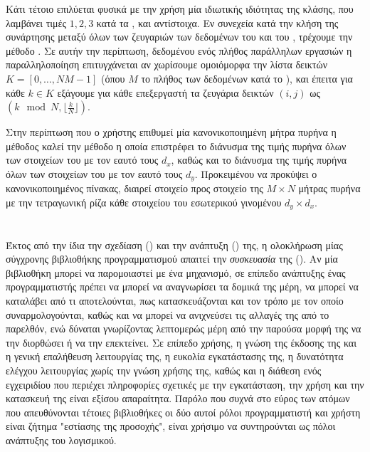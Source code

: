 Κάτι τέτοιο επιλύεται φυσικά με την χρήση μία ιδιωτικής ιδιότητας \texttt{} της κλάσης, που λαμβάνει τιμές $1, 2, 3$ κατά τα \texttt{}, \texttt{} και \texttt{} αντίστοιχα.
Εν συνεχεία κατά την κλήση της συνάρτησης \texttt{} μεταξύ όλων των ζευγαριών των δεδομένων του \texttt{} και του \texttt{}, τρέχουμε την μέθοδο \texttt{}.
Σε αυτήν την περίπτωση, δεδομένου ενός πλήθος παράλληλων εργασιών \texttt{} η παραλληλοποίηση επιτυγχάνεται αν χωρίσουμε ομοιόμορφα την λίστα δεικτών $K = [0, \dots, Ν Μ - 1]$ (όπου $Μ$ το πλήθος των δεδομένων κατά το \texttt{}), και έπειτα για κάθε $k \in K$ εξάγουμε για κάθε επεξεργαστή τα ζευγάρια δεικτών $(i,j)$ ως $(k\mod N, \lfloor \frac{k}{N} \rfloor)$.\par
Στην περίπτωση που ο χρήστης επιθυμεί μία κανονικοποιημένη μήτρα πυρήνα η μέθοδος \texttt{} καλεί την μέθοδο \texttt{} η οποία επιστρέφει το διάνυσμα της τιμής πυρήνα όλων των στοιχείων του \texttt{} με τον εαυτό τους $d_{x}$, καθώς και το διάνυσμα της τιμής πυρήνα όλων των στοιχείων του \texttt{} με τον εαυτό τους $d_{y}$.
Προκειμένου να προκύψει ο κανονικοποιημένος πίνακας, διαιρεί στοιχείο προς στοιχείο της $Μ \times N$ μήτρας πυρήνα με την τετραγωνική ρίζα κάθε στοιχείου του εσωτερικού γινομένου $d_{y} \times d_{x}$.


\section{}
Έκτος από την ίδια την σχεδίαση () και την ανάπτυξη () της, η ολοκλήρωση μίας σύγχρονης βιβλιοθήκης προγραμματισμού απαιτεί την \textit{συσκευασία} της ().
Αν μία βιβλιοθήκη μπορεί να παρομοιαστεί με ένα μηχανισμό, σε επίπεδο ανάπτυξης ένας προγραμματιστής πρέπει να μπορεί να αναγνωρίσει τα δομικά της μέρη, να μπορεί να καταλάβει από τι αποτελούνται, πως κατασκευάζονται και τον τρόπο με τον οποίο συναρμολογούνται, καθώς και να μπορεί να ανιχνεύσει τις αλλαγές της από το παρελθόν, ενώ δύναται γνωρίζοντας λεπτομερώς μέρη από την παρούσα μορφή της να την διορθώσει ή να την επεκτείνει.
Σε επίπεδο χρήσης, η γνώση της έκδοσης της και η γενική επαλήθευση λειτουργίας της, η ευκολία εγκατάστασης της, η δυνατότητα ελέγχου λειτουργίας χωρίς την γνώση χρήσης της, καθώς και η διάθεση ενός εγχειριδίου που περιέχει πληροφορίες σχετικές με την εγκατάσταση, την χρήση και την κατασκευή της είναι εξίσου απαραίτητα.
Παρόλο που συχνά στο εύρος των ατόμων που απευθύνονται τέτοιες βιβλιοθήκες οι δύο αυτοί ρόλοι προγραμματιστή και χρήστη είναι ζήτημα "εστίασης της προσοχής", είναι χρήσιμο να συντηρούνται ως πόλοι ανάπτυξης του λογισμικού.
